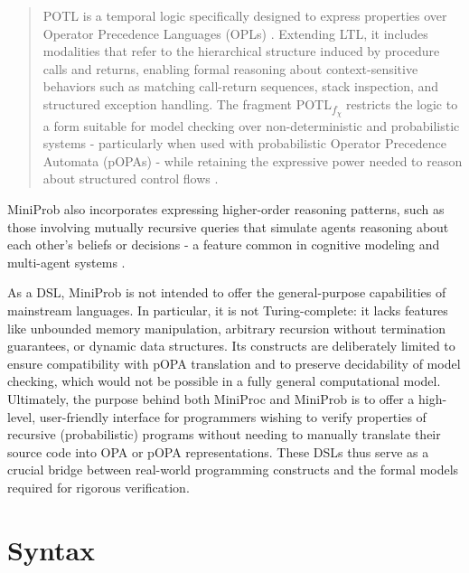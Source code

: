 \begin{quote}
  POTL is a temporal logic specifically designed to express properties over Operator Precedence Languages (OPLs) \cite{chiari2020potlfirstordercompletetemporal,Chiari_2022}.
  Extending LTL, it includes modalities that refer to the hierarchical structure induced by procedure calls and returns,
  enabling formal reasoning about context-sensitive behaviors such as matching call-return sequences, stack inspection, and structured exception handling.
  The fragment POTL\textsubscript{$f_\chi$} restricts the logic to a form suitable for model checking over non-deterministic and probabilistic systems - particularly when
  used with probabilistic Operator Precedence Automata (pOPAs) - while retaining the expressive power needed to reason about structured control flows \cite{2025modelcheckingprobabilisticoperator}.
\end{quote}

MiniProb also incorporates expressing higher-order reasoning patterns, such as those involving mutually recursive queries that simulate agents reasoning about each other's
beliefs or decisions - a feature common in cognitive modeling and multi-agent systems \cite{multiAgent}.

As a DSL, MiniProb is not intended to offer the general-purpose capabilities of mainstream languages. In particular, it is not Turing-complete:
it lacks features like unbounded memory manipulation, arbitrary recursion without termination guarantees, or dynamic data structures. Its constructs are deliberately
limited to ensure compatibility with pOPA translation and to preserve decidability of model checking, which would not be possible in a fully general computational model.
\\

Ultimately, the purpose behind both MiniProc and MiniProb is to offer a high-level, user-friendly interface for programmers wishing to verify properties of recursive (probabilistic) programs without needing to manually translate their source code into OPA or pOPA representations. These DSLs thus serve as a crucial bridge between real-world programming constructs and the formal models required for rigorous verification.

\section{Syntax}

